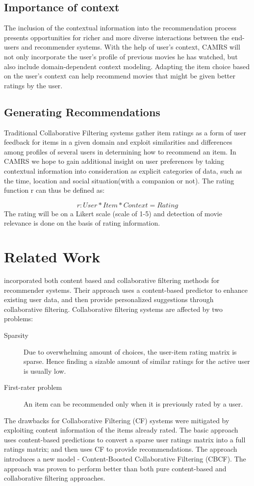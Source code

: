 \documentclass{article}
\begin{document}
\subsection{Importance of context} 
The inclusion of the contextual information into the recommendation process presents opportunities for richer and more diverse interactions between the end-users and recommender systems. With the help of user's context, CAMRS will not only incorporate the user's profile of previous movies he has watched, but also include domain-dependent context modeling. Adapting the item choice based on the user's context can help recommend movies that might be given better ratings by the user.

\subsection{Generating Recommendations}
Traditional Collaborative Filtering systems gather item ratings as a form of user feedback for items in a given domain and exploit similarities and differences among profiles of several users in determining how to recommend an item. In CAMRS we hope to gain additional insight on user preferences by taking contextual information into consideration as explicit categories of data, such as the time, location and social situation(with a companion or not). The rating function r can thus be defined as: 

\begin{equation}
r: User * Item * Context = Rating 
\end{equation}
The rating will be on a Likert scale (scale of 1-5) and detection of movie relevance is done on the basis of rating information. 

\section{Related Work}
\cite{melville2002content} incorporated both content based and collaborative filtering methods for recommender systems. Their approach uses a content-based predictor to enhance existing user data, and then provide personalized suggestions through collaborative filtering. Collaborative filtering systems are affected by two problems:
\begin{description}
\item[Sparsity] Due to overwhelming amount of choices, the user-item rating matrix is sparse. Hence finding a sizable amount of similar ratings for the active user is usually low.\item[First-rater problem] An item can be recommended only when it is previously rated by a user.
\end{description}
The drawbacks for Collaborative Filtering (CF) systems were mitigated by exploiting content information of the items already rated. The basic approach uses content-based predictions to convert a sparse user ratings matrix into a full ratings matrix; and then uses CF to provide recommendations. The approach introduces a new model - Content-Boosted Collaborative Filtering (CBCF). The approach was proven to perform better than both pure content-based and collaborative filtering approaches.
\end{document}
